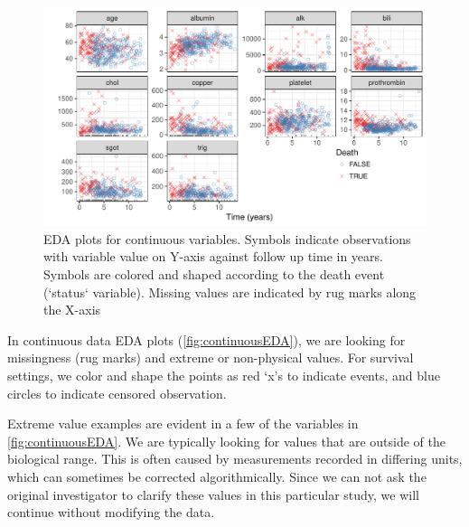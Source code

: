 \documentclass[article]{jss}
\begin{document}
\begin{Schunk}
\begin{figure}[!htb]

{\centering \includegraphics{rfs-continuousEDA-1} 

}

\caption[EDA plots for continuous variables]{EDA plots for continuous variables. Symbols indicate observations with variable value on Y-axis against follow up time in years. Symbols are colored and shaped according to the death event  (`status` variable). Missing values are indicated by rug marks along the X-axis}\label{fig:continuousEDA}
\end{figure}
\end{Schunk}

In continuous data EDA plots (\autoref{fig:continuousEDA}), we are
looking for missingness (rug marks) and extreme or non-physical values.
For survival settings, we color and shape the points as red `x's to
indicate events, and blue circles to indicate censored observation.

Extreme value examples are evident in a few of the variables in
\autoref{fig:continuousEDA}. We are typically looking for values that
are outside of the biological range. This is often caused by
measurements recorded in differing units, which can sometimes be
corrected algorithmically. Since we can not ask the original
investigator to clarify these values in this particular study, we will
continue without modifying the data.
\end{document}
